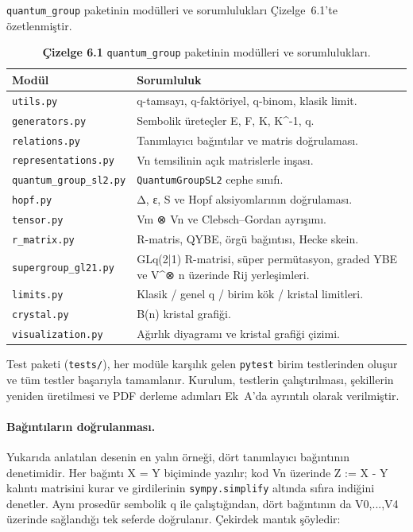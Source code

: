 \documentclass[12pt,a4paper]{report}
\numberwithin{equation}{chapter}
\theoremstyle{plain}
\theoremstyle{definition}
\begin{document}
\texttt{quantum\_group} paketinin modülleri ve sorumlulukları
Çizelge~6.1'te özetlenmiştir.

\begin{table}[h]
\centering
\small
\caption{\textbf{Çizelge 6.1} \texttt{quantum\_group} paketinin modülleri ve sorumlulukları.}
\label{tab:modules}
\begin{tabularx}{\textwidth}{@{}>{\raggedright\arraybackslash}p{}X@{}}
\toprule
Modül & Sorumluluk \\
\midrule
\texttt{utils.py} & q-tamsayı, q-faktöriyel, q-binom, klasik limit. \\
\texttt{generators.py} & Sembolik üreteçler E, F, K, K^-1, q. \\
\texttt{relations.py} & Tanımlayıcı bağıntılar ve matris doğrulaması. \\
\texttt{representations.py} & Vn temsilinin açık matrislerle inşası. \\
\texttt{quantum\_group\_sl2.py} & \texttt{QuantumGroupSL2} cephe sınıfı. \\
\texttt{hopf.py} & Δ, ε, S ve Hopf aksiyomlarının doğrulaması. \\
\texttt{tensor.py} & Vm ⊗ Vn ve Clebsch--Gordan ayrışımı. \\
\texttt{r\_matrix.py} & R-matris, QYBE, örgü bağıntısı, Hecke skein. \\
\texttt{supergroup\_gl21.py} & GLq(2|1) R-matrisi, süper permütasyon, graded YBE ve V^⊗ n üzerinde Rij yerleşimleri. \\
\texttt{limits.py} & Klasik / genel q / birim kök / kristal limitleri. \\
\texttt{crystal.py} & B(n) kristal grafiği. \\
\texttt{visualization.py} & Ağırlık diyagramı ve kristal grafiği çizimi. \\
\bottomrule
\end{tabularx}
\end{table}

Test paketi (\texttt{tests/}), her modüle karşılık gelen \texttt{pytest} birim
testlerinden oluşur ve tüm testler başarıyla tamamlanır. Kurulum, testlerin
çalıştırılması, şekillerin yeniden üretilmesi ve PDF derleme adımları
Ek~A'da ayrıntılı olarak verilmiştir.

\paragraph{Bağıntıların doğrulanması.} Yukarıda anlatılan desenin en yalın
örneği, dört tanımlayıcı bağıntının denetimidir. Her bağıntı X = Y biçiminde
yazılır; kod Vn üzerinde Z := X - Y kalıntı matrisini kurar ve girdilerinin
\texttt{sympy.simplify} altında sıfıra indiğini denetler. Aynı prosedür sembolik
q ile çalıştığından, dört bağıntının da V0,...,V4 üzerinde sağlandığı
tek seferde doğrulanır. Çekirdek mantık şöyledir:
\end{document}
